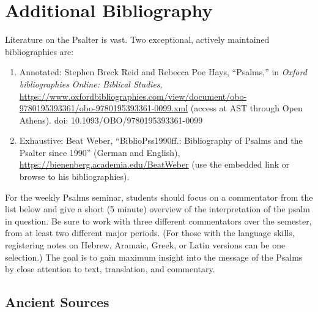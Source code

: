 \documentclass[titlepage]{article}
\newcommand\policy{../policy}
\begin{document}



\section{Additional Bibliography}
\label{bibliography}

Literature on the Psalter is vast. Two exceptional, actively maintained bibliographies are:

\begin{enumerate}
	\item Annotated: Stephen Breck Reid and Rebecca Poe Hays, “Psalms,” in \emph{Oxford bibliographies Online: Biblical Studies}, \href{https://go.openathens.net/redirector/astheology.ns.ca?url=https://www.oxfordbibliographies.com/view/document/obo-9780195393361/obo-9780195393361-0099.xml}{https://www.oxfordbibliographies.com/view/document/obo-9780195393361/obo-9780195393361-0099.xml} (access at AST through Open Athens). doi: 10.1093/OBO/9780195393361-0099
	\item Exhaustive: Beat Weber, “BiblioPss1990ff.: Bibliography of Psalms and the Psalter since 1990” (German and English), \href{https://www.academia.edu/5910732/BiblioPss1990ff_Bibliography_of_Psalms_and_the_Psalter_since_1990}{https://bienenberg.academia.edu/BeatWeber} (use the embedded link or browse to his bibliographies).

\end{enumerate}

For the weekly Psalms seminar, students should focus on a commentator
from the list below and give a short (5 minute) overview of the
interpretation of the psalm in question. Be sure to work with three
different commentators over the semester, from at least two different
major periods. (For those with the language skills, registering notes on
Hebrew, Aramaic, Greek, or Latin versions can be one selection.) The
goal is to gain maximum insight into the message of the Psalms by close
attention to text, translation, and commentary.

\subsection{Ancient Sources}
\label{oldbib}
\end{document}
